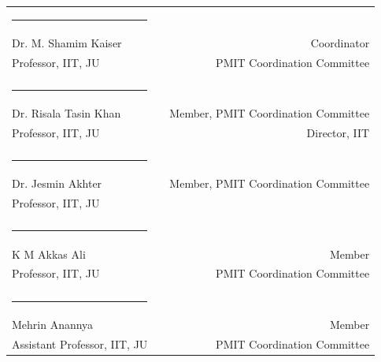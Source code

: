\noindent \begin{tabular}{lp{1cm}r}
\centering
  \rule{4cm}{1pt}&\\
     Dr. M. Shamim Kaiser &&Coordinator  \\
     Professor, IIT, JU  & & PMIT Coordination Committee  \\
     & &  \\
     \rule{4cm}{1pt}&\\
    Dr. Risala Tasin Khan  & &Member, PMIT Coordination Committee \\
    Professor, IIT, JU  & & Director, IIT\\
     & &  \\
     \rule{4cm}{1pt}&\\
    Dr. Jesmin Akhter  & &Member, PMIT Coordination Committee   \\
    Professor, IIT, JU  & \\
    & &  \\
     \rule{4cm}{1pt}&\\
    K M Akkas Ali  & &Member  \\
     Professor, IIT, JU  & &PMIT Coordination Committee  \\
     &  \\
     \rule{4cm}{1pt}&\\
     Mehrin Anannya   & &Member  \\
    Assistant Professor, IIT, JU  & &PMIT Coordination Committee  \\
    
\end{tabular}